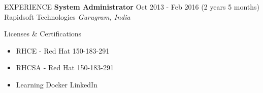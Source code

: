 \documentclass{resume} %
\begin{document}
\begin{rSection}{EXPERIENCE}
 \textbf{System Administrator} \hfill Oct 2013 - Feb 2016 (2 years 5 months)\\
Rapidsoft Technologies \hfill \textit{Gurugram, India}

\end{rSection} 






\begin{rSection}{Licenses \& Certifications} 
\begin{itemize}
    \item RHCE - Red Hat \hfill 150-183-291
    \item RHCSA - Red Hat \hfill 150-183-291
    \item Learning Docker \hfill LinkedIn 
\end{itemize}


\end{rSection}
\end{document}

